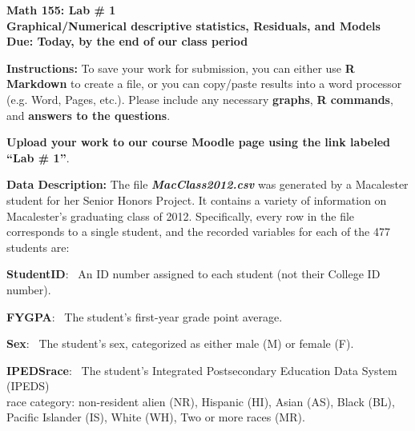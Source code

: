 \documentclass[12pt]{report}
\begin{document}
\begin{center}
\textbf{Math 155: Lab \# 1}\\ \vspace{2mm}
\textbf{Graphical/Numerical descriptive statistics, Residuals, and Models}\\ \vspace{2mm}
\textbf{Due: Today, by the end of our class period}\\ \vspace{2mm}
\end{center}
\textbf{Instructions:} To save your work for submission, you can either use \textbf{R Markdown} to create a file, or you can copy/paste results into a word processor (e.g. Word, Pages, etc.). Please include any necessary \textbf{graphs}, \textbf{R commands}, and \textbf{answers to the questions}. \vspace{6mm}

\noindent \textbf{Upload your work to our course Moodle page using the link labeled ``Lab \# 1''}. \vspace{6mm}

\noindent \textbf{Data Description:} The file \emph{\textbf{MacClass2012.csv}} was generated by a Macalester student for her Senior Honors Project. It contains a variety of information on Macalester's graduating class of 2012. Specifically, every row in the file corresponds to a single student, and the recorded variables for each of the 477 students are:\\ \vspace{-1mm}

\noindent \textbf{StudentID}:~ An ID number assigned to each student (not their College ID number).\vspace{1mm}

\noindent \textbf{FYGPA}:~ The student's first-year grade point average. \vspace{1mm}

\noindent \textbf{Sex}:~ The student's sex, categorized as either male (M) or female (F). \vspace{1mm}

\noindent \textbf{IPEDSrace}:~ The student's Integrated Postsecondary Education Data System (IPEDS)\\\phantom{1}\hspace{2.3cm}race category: non-resident alien (NR), Hispanic (HI), Asian (AS), Black (BL),\\\phantom{1}\hspace{2.15cm} Pacific Islander (IS), White (WH), Two or more races (MR). \vspace{1mm}
\end{document}
